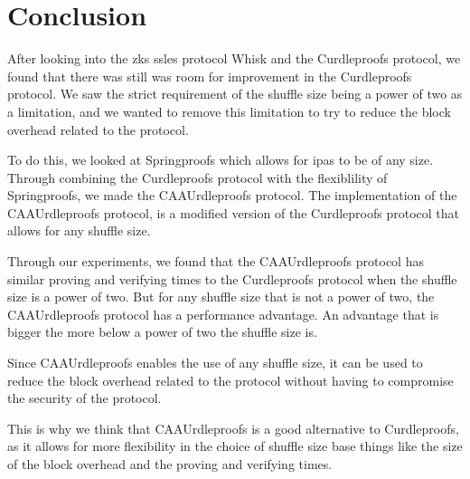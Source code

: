 

\section{Conclusion}\label{sec:conclusion}
After looking into the \glspl{zk} \glspl{ssle} protocol Whisk and the Curdleproofs protocol, we found that there was still was room for improvement in the Curdleproofs protocol.
We saw the strict requirement of the shuffle size being a power of two as a limitation, and we wanted to remove this limitation to try to reduce the block overhead related to the protocol.

To do this, we looked at Springproofs which allows for \glspl{ipa} to be of any size.
Through combining the Curdleproofs protocol with the flexiblility of Springproofs, we made the CAAUrdleproofs protocol.
The implementation of the CAAUrdleproofs protocol, is a modified version of the Curdleproofs protocol that allows for any shuffle size.

Through our experiments, we found that the CAAUrdleproofs protocol has similar proving and verifying times to the Curdleproofs protocol when the shuffle size is a power of two.
But for any shuffle size that is not a power of two, the CAAUrdleproofs protocol has a performance advantage. 
An advantage that is bigger the more below a power of two the shuffle size is.

Since CAAUrdleproofs enables the use of any shuffle size, it can be used to reduce the block overhead related to the protocol without having to compromise the security of the protocol.

This is why we think that CAAUrdleproofs is a good alternative to Curdleproofs, as it allows for more flexibility in the choice of shuffle size base things like the size of the block overhead and the proving and verifying times.
